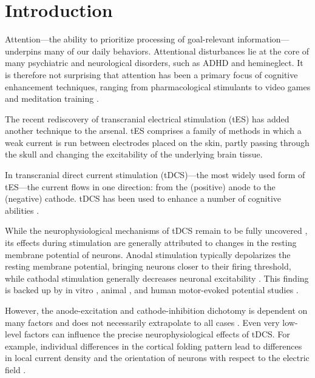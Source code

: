 \documentclass[11pt,]{memoir}
\begin{document}
\hypertarget{tDCS_att_review-introduction}{%
\section{Introduction}\label{tDCS_att_review-introduction}}

Attention---the ability to prioritize processing of goal-relevant information---underpins many of our daily behaviors. Attentional disturbances lie at the core of many psychiatric and neurological disorders, such as ADHD and hemineglect. It is therefore not surprising that attention has been a primary focus of cognitive enhancement techniques, ranging from pharmacological stimulants \autocite{Koelega1993} to video games \autocite{Green2012} and meditation training \autocite{Lutz2008}.

The recent rediscovery of transcranial electrical stimulation (tES) has added another technique to the arsenal. tES comprises a family of methods in which a weak current is run between electrodes placed on the skin, partly passing through the skull and changing the excitability of the underlying brain tissue.

In transcranial direct current stimulation (tDCS)---the most widely used form of tES---the current flows in one direction: from the (positive) anode to the (negative) cathode. tDCS has been used to enhance a number of cognitive abilities \autocites{Coffman2014}{CohenKadosh2014}{Mancuso2016}[but see][]{Horvath2015}.

While the neurophysiological mechanisms of tDCS remain to be fully uncovered \autocites[for reviews, see][]{Stagg2011b}{Medeiros2012}, its effects during stimulation are generally attributed to changes in the resting membrane potential of neurons. Anodal stimulation typically depolarizes the resting membrane potential, bringing neurons closer to their firing threshold, while cathodal stimulation generally decreases neuronal excitability \autocite{Nitsche2008}. This finding is backed up by in vitro \autocite{Terzuolo1956}, animal \autocite{Bindman1964}, and human motor-evoked potential studies \autocites{Nitsche2000}{Nitsche2001}.

However, the anode-excitation and cathode-inhibition dichotomy is dependent on many factors and does not necessarily extrapolate to all cases \autocites{Bestmann2014}{Jacobson2012}{Parkin2015}. Even very low-level factors can influence the precise neurophysiological effects of tDCS. For example, individual differences in the cortical folding pattern lead to differences in local current density \autocite{Opitz2015} and the orientation of neurons with respect to the electric field \autocite{Radman2009}.
\end{document}
